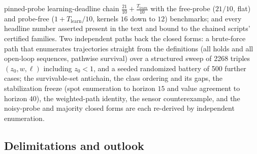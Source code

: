 \documentclass[10pt,twocolumn]{article}
\theoremstyle{plain}
\theoremstyle{definition}
\theoremstyle{remark}
\begin{document}
pinned-probe learning-deadline chain
\(\tfrac{21}{10} + \tfrac{T_{\mathrm{learn}}}{10}\) with the
free-probe (\(21/10\), flat) and probe-free
(\(1 + T_{\mathrm{learn}}/10\), kernels \(16\) down to \(12\))
benchmarks; and every headline
number asserted present in the text and bound to the chained scripts'
certified families. Two independent paths back the closed forms: a
brute-force path that enumerates trajectories straight from the
definitions (all holds and all open-loop sequences, pathwise survival)
over a structured sweep of 2268 triples
\((z_{0}, w, \ell)\) including \(z_{0} < 1\), and a seeded
randomized battery of 500 further cases; the survivable-set antichain,
the class ordering and its gaps, the stabilization freeze (spot
enumeration to horizon \(15\) and value agreement to horizon
\(40\)), the weighted-path identity, the sensor counterexample, and
the noisy-probe and majority closed forms are each re-derived by
independent enumeration.

\subsection{Delimitations and outlook}\label{scope}
\end{document}

